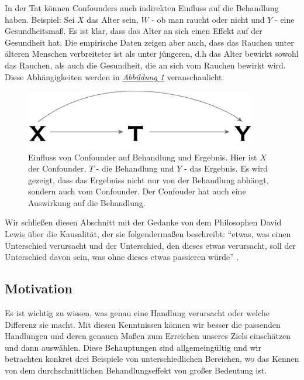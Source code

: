 \documentclass[12pt,a4paper,twoside]{scrartcl}
\numberwithin{equation}{section}
\newcommand{\reffig}[1]{\emph{\hyperref[#1]{Abbildung \ref*{#1}}}}
\begin{document}
\noindent
In der Tat können Confounders auch indirekten Einfluss auf die Behandlung haben. Beispiel: Sei $X$ das Alter sein, $W$ - ob man raucht oder nicht und $Y$ - eine Gesundheitsmaß. Es ist klar, dass das Alter an sich einen Effekt auf der Gesundheit hat. Die empirische Daten zeigen aber auch, dass das Rauchen unter älteren Menschen verbreiteter ist als unter jüngeren, d.h das Alter bewirkt sowohl das Rauchen, als auch die Gesundheit, die an sich vom Rauchen bewirkt wird. Diese Abhängigkeiten werden in \reffig{fig:confounder} veranschaulicht.\par   	
\begin{center}
  \vspace{6mm}
  \begin{figure}[h]
    \centering
    \includegraphics[height=0.4\textwidth, width=0.9\textwidth]{figures/confounder.png}
    \caption[Einfluss von Confounder auf Behandlung und Ergebnis]{Einfluss von Confounder auf Behandlung und Ergebnis\cite{RebBar}. Hier ist $X$ der Confounder, $T$ - die Behandlung und $Y$ - das Ergebnis. Es wird gezeigt, dass das Ergebniss nicht nur von der Behandlung abhängt, sondern auch vom Confounder. Der Confouder hat auch eine Auswirkung auf die Behandlung.}\label{fig:confounder}
  \end{figure}
\end{center}

\noindent
Wir schließen diesen Abschnitt mit der Gedanke von dem Philosophen David Lewis über die Kausalität, der sie folgendermaßen beschreibt: \enquote{etwas, was einen Unterschied verursacht und der Unterschied, den dieses etwas verursacht, soll der Unterschied  davon sein, was ohne dieses etwas passieren würde} \cite{lewis1974causation}.\par

\subsection{Motivation}\label{subsec:motivation}
Es ist wichtig zu wissen, was genau eine Handlung verursacht oder welche Differenz sie macht. Mit diesen Kenntnissen können wir besser die passenden Handlungen und deren genauen Maßen zum Erreichen unseres Ziels einschätzen und dann auswählen. Diese Behauptungen sind allgemeingültig und wir betrachten konkret drei Beispiele von unterschiedlichen Bereichen, wo das Kennen von dem durchschnittlichen Behandlungseffekt von großer Bedeutung ist.\par
\end{document}
